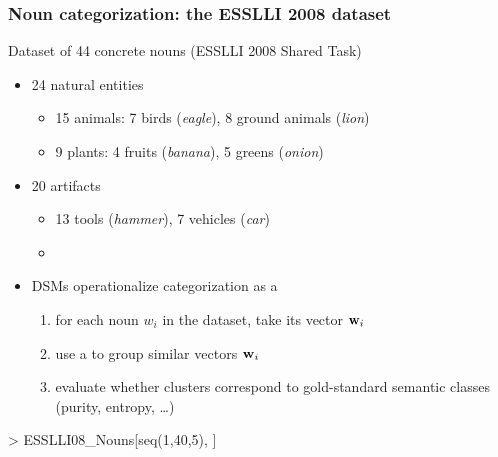 \documentclass[t]{beamer} %
\begin{document}
\begin{frame}[fragile]
  \frametitle{Noun categorization: the ESSLLI 2008 dataset}

  Dataset of 44 concrete nouns (ESSLLI 2008 Shared Task)
  \begin{itemize}
  \item 24 natural entities
    \begin{itemize}
    \item 15 animals: 7 birds (\emph{eagle}), 8 ground animals (\emph{lion})
    \item 9 plants: 4 fruits (\emph{banana}), 5 greens (\emph{onion})
    \end{itemize}
  \item 20 artifacts
    \begin{itemize}
    \item 13 tools (\emph{hammer}), 7 vehicles (\emph{car})
    \item[]
    \end{itemize}
  \item<2-> DSMs operationalize categorization as a 
    \begin{enumerate}
    \item for each noun $w_i$ in the dataset, take its vector $\vw_i$
    \item use a  to group similar vectors $\vw_i$
    \item evaluate whether clusters correspond to gold-standard semantic
      classes (purity, entropy, \ldots)
    \end{enumerate}
  \end{itemize}

\begin{Rcode}
> ESSLLI08_Nouns[seq(1,40,5), ]
\end{Rcode}
\end{frame}
\end{document}
